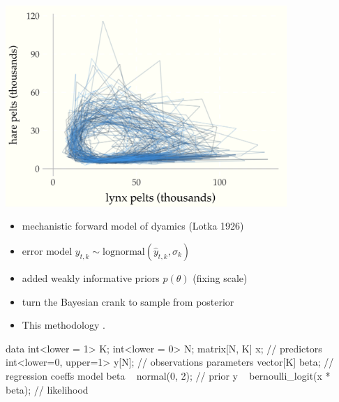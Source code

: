\documentclass[9pt]{report}
\begin{document}
\begin{center}
\includegraphics[width=0.8\textwidth]{img/lotka-volterra-posterior-time.png}
\end{center}

\begin{itemize}
\item mechanistic forward model of dyamics (Lotka 1926)
\item error model $y_{t,k} \sim \textrm{lognormal}(\hat{y}_{t,k}, \sigma_k)$
\item added weakly informative priors $p(\theta)$ (fixing scale) 
\item turn the Bayesian crank to sample from posterior
\item This methodology .
\end{itemize}


%
\begin{stancode}
 data {
   int<lower = 1> K;
   int<lower = 0> N;
   matrix[N, K] x;                  // predictors
   int<lower=0, upper=1> y[N];      // observations
 }
 parameters {
   vector[K] beta;                  // regression coeffs
 }
 model {
   beta ~ normal(0, 2);            // prior
   y ~ bernoulli_logit(x * beta);  // likelihood
 }
\end{stancode}
\end{document}

